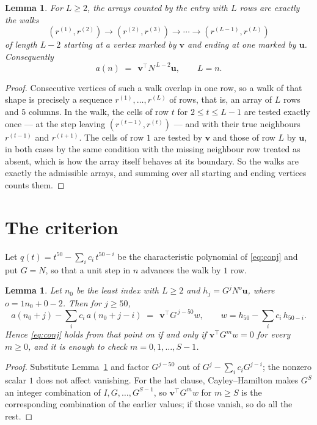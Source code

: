 \documentclass[11pt,a4paper]{article}
\theoremstyle{plain}
\newtheorem{lemma}[theorem]{Lemma}
\theoremstyle{definition}
\begin{document}
\begin{lemma}\label{lem:walk}
For $L\ge2$, the arrays counted by the entry with $L$ rows are exactly the walks
\[
(r^{(1)},r^{(2)})\to(r^{(2)},r^{(3)})\to\cdots\to(r^{(L-1)},r^{(L)})
\]
of length $L-2$ starting at a vertex marked by $\mathbf{v}$ and ending at one marked by
$\mathbf{u}$. Consequently
\[
a(n)\;=\;\,\mathbf{v}^{\!\top}N^{\,L-2}\mathbf{u},\qquad L=n .
\]
\end{lemma}

\begin{proof}
Consecutive vertices of such a walk overlap in one row, so a walk of that shape is
precisely a sequence $r^{(1)},\dots,r^{(L)}$ of rows, that is, an array of $L$ rows
and $5$ columns. In the walk, the cells of row $t$ for $2\le t\le L-1$ are tested
exactly once --- at the step leaving $(r^{(t-1)},r^{(t)})$ --- and with their true
neighbours $r^{(t-1)}$ and $r^{(t+1)}$. The cells of row $1$ are tested by
$\mathbf{v}$ and those of row $L$ by $\mathbf{u}$, in both cases by the same condition
with the missing neighbour row treated as absent, which is how the array itself behaves at
its boundary. So the walks are exactly the admissible arrays, and summing over all starting
and ending vertices counts them.
\end{proof}

\section{The criterion}

Let $q(t)=t^{50}-\sum_i c_i\,t^{50-i}$ be the characteristic polynomial of
\eqref{eq:conj} and put $G=N$, so that a unit step in $n$ advances the walk by
$1$ row.

\begin{lemma}\label{lem:crit}
Let $n_0$ be the least index with $L\ge2$ and $h_j=G^{j}N^{o}\mathbf{u}$, where
$o=1n_0+0-2$. Then for $j\ge50$,
\[
a(n_0+j)-\sum_i c_i\,a(n_0+j-i)\;=\;\,\mathbf{v}^{\!\top}G^{\,j-50}w,
\qquad w=h_{50}-\sum_i c_i\,h_{50-i} .
\]
Hence \eqref{eq:conj} holds from that point on if and only if
$\mathbf{v}^{\!\top}G^{m}w=0$ for every $m\ge0$, and it is enough to check
$m=0,1,\dots,S-1$.
\end{lemma}

\begin{proof}
Substitute Lemma~\ref{lem:walk} and factor $G^{j-50}$ out of
$G^{j}-\sum_ic_iG^{j-i}$; the nonzero scalar $1$ does not affect
vanishing. For the last clause, Cayley--Hamilton makes $G^{S}$ an integer combination of
$I,G,\dots,G^{S-1}$, so $\mathbf{v}^{\!\top}G^{m}w$ for $m\ge S$ is the corresponding
combination of the earlier values; if those vanish, so do all the rest.
\end{proof}
\end{document}
